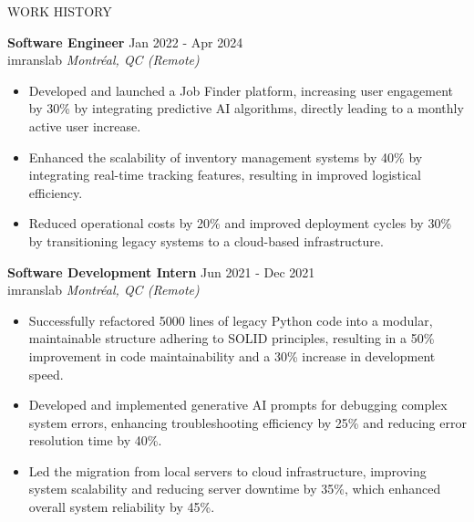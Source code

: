 \documentclass{resume} %
\begin{document}
\begin{rSection}{WORK HISTORY}

\textbf{Software Engineer} \hfill Jan 2022 - Apr 2024\\
imranslab \hfill \textit{Montréal, QC (Remote)}
 \begin{itemize}
    \item Developed and launched a Job Finder platform, increasing user engagement by 30\% by integrating predictive AI algorithms, directly leading to a monthly active user increase.
    \item Enhanced the scalability of inventory management systems by 40\% by integrating real-time tracking features, resulting in improved logistical efficiency.
    \item Reduced operational costs by 20\% and improved deployment cycles by 30\% by transitioning legacy systems to a cloud-based infrastructure.
 \end{itemize}

\textbf{Software Development Intern} \hfill Jun 2021 - Dec 2021\\
imranslab \hfill \textit{Montréal, QC (Remote)}
 \begin{itemize}
    \item Successfully refactored 5000 lines of legacy Python code into a modular, maintainable structure adhering to SOLID principles, resulting in a 50\% improvement in code maintainability and a 30\% increase in development speed.
    \item Developed and implemented generative AI prompts for debugging complex system errors, enhancing troubleshooting efficiency by 25\% and reducing error resolution time by 40\%.
    \item Led the migration from local servers to cloud infrastructure, improving system scalability and reducing server downtime by 35\%, which enhanced overall system reliability by 45\%.
 \end{itemize}

\end{rSection} 

\end{document}
